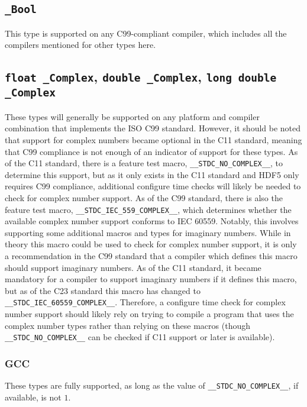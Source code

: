 \documentclass[../HDF5_RFC.tex]{subfiles}
\begin{document}
\subsection{\texttt{\_Bool}}

This type is supported on any C99-compliant compiler, which includes all the compilers mentioned for other types here.

\subsection{\texttt{float \_Complex}, \texttt{double \_Complex}, \texttt{long double \_Complex}}

These types will generally be supported on any platform and compiler combination that
implements the ISO C99 standard. However, it should be noted that support for complex
numbers became optional in the C11 standard, meaning that C99 compliance is not enough
of an indicator of support for these types. As of the C11 standard, there is a feature
test macro, \texttt{\_\_STDC\_NO\_COMPLEX\_\_}, to determine this support, but as it only
exists in the C11 standard and HDF5 only requires C99 compliance, additional configure
time checks will likely be needed to check for complex number support. As of the C99
standard, there is also the feature test macro, \texttt{\_\_STDC\_IEC\_559\_COMPLEX\_\_},
which determines whether the available complex number support conforms to IEC 60559.
Notably, this involves supporting some additional macros and types for imaginary numbers.
While in theory this macro could be used to check for complex number support, it is only
a recommendation in the C99 standard that a compiler which defines this macro should support
imaginary numbers. As of the C11 standard, it became mandatory for a compiler to support
imaginary numbers if it defines this macro, but as of the C23 standard this macro has
changed to \texttt{\_\_STDC\_IEC\_60559\_COMPLEX\_\_}. Therefore, a configure time check
for complex number support should likely rely on trying to compile a program that uses
the complex number types rather than relying on these macros (though \texttt{\_\_STDC\_NO\_COMPLEX\_\_}
can be checked if C11 support or later is available).

\subsubsection{GCC}

These types are fully supported, as long as the value of \texttt{\_\_STDC\_NO\_COMPLEX\_\_},
if available, is not $1$.
\end{document}
